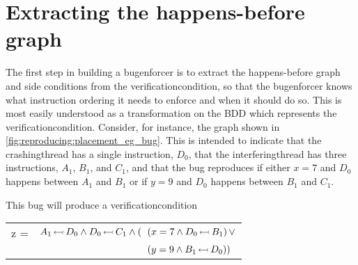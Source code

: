 \section{Extracting the happens-before graph}
\label{sect:enforce:slice_hb_graph}

\begin{wrapfigure}{o}{5.2cm}
  \vspace{-12pt}
  \begin{figgure}
  \caption{}
  \label{fig:reproducing:placement_eg_bug}
  \end{figgure}
  \vspace{-12pt}
\end{wrapfigure}
The first step in building a \gls{bugenforcer} is to extract the
happens-before graph and side conditions from the
\gls{verificationcondition}, so that the \gls{bugenforcer} knows what
instruction ordering it needs to enforce and when it should do so.
This is most easily understood as a transformation on the BDD which
represents the \gls{verificationcondition}.  Consider, for instance,
the graph shown in \autoref{fig:reproducing:placement_eg_bug}.  This
is intended to indicate that the \gls{crashingthread} has a single
instruction, $D_0$, that the \gls{interferingthread} has three
instructions, $A_1$, $B_1$, and $C_1$, and that the bug reproduces if
either $x = 7$ and $D_0$ happens between $A_1$ and $B_1$ or if $y = 9$
and $D_0$ happens between $B_1$ and $C_1$.

This bug will produce a \gls{verificationcondition}

\noindent
{\hfill}
\begin{tabular}{lll}
z = & $A_1\,{\leftarrowtail}\,D_0 \wedge D_0\,{\leftarrowtail}\,C_1 \wedge (\!\!\!\!$ & $(x = 7 \wedge D_0\,{\leftarrowtail}\,B_1)\,\vee$ \\
    &                                                                            & $(y = 9 \wedge B_1\,{\leftarrowtail}\,D_0))$
\end{tabular}
{\hfill}

